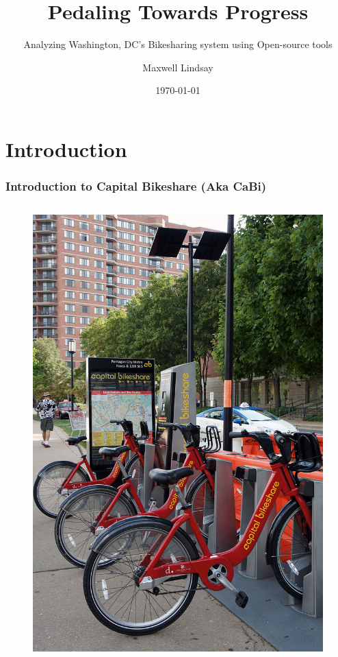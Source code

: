 \documentclass{beamer}
\title{Pedaling Towards Progress}
\subtitle{Analyzing Washington, DC's Bikesharing system using Open-source tools}
\author{Maxwell Lindsay}
\institute{Van Oord}
\date{\today}
\begin{document}
\begin{frame}
    \titlepage
\end{frame}
\section{Introduction}

\begin{frame}
    \frametitle{Introduction to Capital Bikeshare (Aka CaBi)}
    \begin{columns}
        \begin{figure}
            \includegraphics[]{800px-VA_07_2012_Capital_Bikeshare_4152.JPG}

\end{figure}
\end{columns}
\end{frame}
\end{document}
